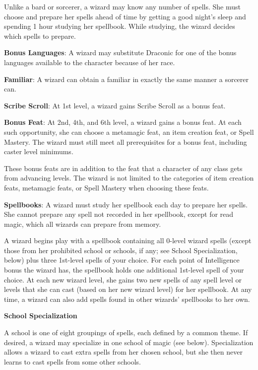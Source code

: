 Unlike a bard or sorcerer, a wizard may know any number of spells. She must choose and prepare her spells ahead of time by getting a good night’s sleep and spending 1 hour studying her spellbook. While studying, the wizard decides which spells to prepare.

\textbf{Bonus Languages}: A wizard may substitute Draconic for one of the bonus languages available to the character because of her race.

\textbf{Familiar}: A wizard can obtain a familiar in exactly the same manner a sorcerer can.

\textbf{Scribe Scroll}: At 1st level, a wizard gains Scribe Scroll as a bonus feat.

\textbf{Bonus Feat}: At 2nd, 4th, and 6th level, a wizard gains a bonus feat. At each such opportunity, she can choose a metamagic feat, an item creation feat, or Spell Mastery. The wizard must still meet all prerequisites for a bonus feat, including caster level minimums.

These bonus feats are in addition to the feat that a character of any class gets from advancing levels. The wizard is not limited to the categories of item creation feats, metamagic feats, or Spell Mastery when choosing these feats.

\textbf{Spellbooks}: A wizard must study her spellbook each day to prepare her spells. She cannot prepare any spell not recorded in her spellbook, except for read magic, which all wizards can prepare from memory.

A wizard begins play with a spellbook containing all 0-level wizard spells (except those from her prohibited school or schools, if any; see School Specialization, below) plus three 1st-level spells of your choice. For each point of Intelligence bonus the wizard has, the spellbook holds one additional 1st-level spell of your choice. At each new wizard level, she gains two new spells of any spell level or levels that she can cast (based on her new wizard level) for her spellbook. At any time, a wizard can also add spells found in other wizards’ spellbooks to her own.

\textbf{\large{School Specialization}}

A school is one of eight groupings of spells, each defined by a common theme. If desired, a wizard may specialize in one school of magic (see below). Specialization allows a wizard to cast extra spells from her chosen school, but she then never learns to cast spells from some other schools.

